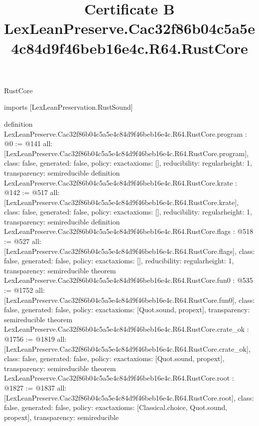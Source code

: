 \begin{lexlean}{RustCore}
\title{Certificate B LexLeanPreserve.Cac32f86b04c5a5e4c84d9f46beb16e4c.R64.RustCore}
\begin{coremodule}
imports [LexLeanPreservation.RustSound]

definition LexLeanPreserve.Cac32f86b04c5a5e4c84d9f46beb16e4c.R64.RustCore.program : @0 := @141 {
  all: [LexLeanPreserve.Cac32f86b04c5a5e4c84d9f46beb16e4c.R64.RustCore.program],
  class: false,
  generated: false,
  policy: exact{axioms: []},
  reducibility: regular{height: 1},
  transparency: semireducible
}
definition LexLeanPreserve.Cac32f86b04c5a5e4c84d9f46beb16e4c.R64.RustCore.krate : @142 := @517 {
  all: [LexLeanPreserve.Cac32f86b04c5a5e4c84d9f46beb16e4c.R64.RustCore.krate],
  class: false,
  generated: false,
  policy: exact{axioms: []},
  reducibility: regular{height: 1},
  transparency: semireducible
}
definition LexLeanPreserve.Cac32f86b04c5a5e4c84d9f46beb16e4c.R64.RustCore.flags : @518 := @527 {
  all: [LexLeanPreserve.Cac32f86b04c5a5e4c84d9f46beb16e4c.R64.RustCore.flags],
  class: false,
  generated: false,
  policy: exact{axioms: []},
  reducibility: regular{height: 1},
  transparency: semireducible
}
theorem LexLeanPreserve.Cac32f86b04c5a5e4c84d9f46beb16e4c.R64.RustCore.fun0 : @535 := @1752 {
  all: [LexLeanPreserve.Cac32f86b04c5a5e4c84d9f46beb16e4c.R64.RustCore.fun0],
  class: false,
  generated: false,
  policy: exact{axioms: [Quot.sound, propext]},
  transparency: semireducible
}
theorem LexLeanPreserve.Cac32f86b04c5a5e4c84d9f46beb16e4c.R64.RustCore.crate_ok : @1756 := @1819 {
  all: [LexLeanPreserve.Cac32f86b04c5a5e4c84d9f46beb16e4c.R64.RustCore.crate_ok],
  class: false,
  generated: false,
  policy: exact{axioms: [Quot.sound, propext]},
  transparency: semireducible
}
theorem LexLeanPreserve.Cac32f86b04c5a5e4c84d9f46beb16e4c.R64.RustCore.root : @1827 := @1837 {
  all: [LexLeanPreserve.Cac32f86b04c5a5e4c84d9f46beb16e4c.R64.RustCore.root],
  class: false,
  generated: false,
  policy: exact{axioms: [Classical.choice, Quot.sound, propext]},
  transparency: semireducible
}


\end{coremodule}
\end{lexlean}
